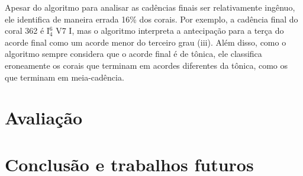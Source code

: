 Apesar do algoritmo para analisar as cadências finais ser
relativamente ingênuo, ele identifica de maneira errada 16\% dos
corais. Por exemplo, a cadência final do coral 362 é I$^6_4$ V7 I, mas
o algoritmo interpreta a antecipação para a terça do acorde final como
um acorde menor do terceiro grau (iii). Além disso, como o algoritmo
sempre considera que o acorde final é de tônica, ele classifica
eroneamente os corais que terminam em acordes diferentes da tônica,
como os que terminam em meia-cadência.

\section{Avaliação}
\label{sec:avaliacao}

\section{Conclusão e trabalhos futuros}
\label{sec:concl-e-trab}

